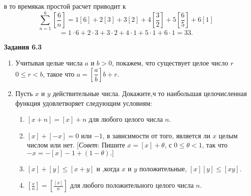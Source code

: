 \documentclass[11pt]{article}
\begin{document}
в то времякак простой расчет приводит к 
$$ \sum_{n=1}^{6}\left[ \frac{6}{n}\right]=1\left[ 6\right] +2\left[ 3\right] +3\left[ 2\right] +4\left[ \frac{3}{2}\right] +5\left[ \frac{6}{5}\right] +6\left[ 1\right] $$
$$=1\cdot6+2\cdot3+3\cdot2+4\cdot1+5\cdot1+6\cdot1=33. $$ 
\newpage
\begin{center}\textbf{Задания 6.3}\end{center}
\begin{enumerate}
	\item Учитывая целые числа $ a $ и $ b>0 $, покажем, что существует целое число $ r $ $ 0\le r<b $, такое что $ a=\left[\dfrac{a}{b}\right]b+r. $
	\item Пусть $ x $ и $ y $ действительные числа. Докажите,ч то наибольшая целочисленная функция удовлетворяет следующим условиям:
		\begin{enumerate}
			\item $ \left[ x+n\right] =\left[ x\right] +n $ для любого целого числа $ n. $
			\item $ \left[ x\right] +\left[ -x\right] =0 $ или $ -1 $, в зависимости от того, является ли $ x $ целым числом или нет. [\textit{Совет}: Пишите $ x=\left[ x\right] +\theta $, с $ 0\le\theta<1 $, так что $ -x=-\left[ x\right] -1+\left( 1-\theta\right).]  $
			\item $\left[ x\right] +\left[ y\right] \le \left[ x+y\right]$ и ,когда $ x $ и $ y $ положительные, $\left[ x\right]\left[ y\right] \le\left[ xy\right] $.
			\item $ \left[ \frac{x}{n}\right] =\left[ \frac{\left[ x\right] }{n}\right]  $ для любого положительного целого числа $ n $. 
			

\end{enumerate}
\end{enumerate}
\end{document}
